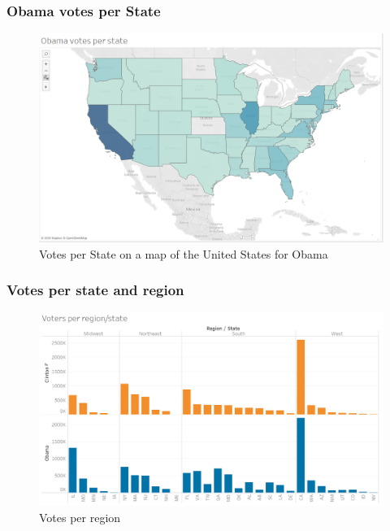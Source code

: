\documentclass[11pt]{article}
\begin{document}
\subsubsection{Obama votes per State}
\begin{figure}[H]
    \centering
    \includegraphics[width=0.90\columnwidth]{assets/obama_state.PNG}
    \caption{Votes per State on a map of the United States for Obama }
    \label{lr}
\end{figure}

\subsubsection{Votes per state and region}
\begin{figure}[H]
    \centering
    \includegraphics[width=0.90\columnwidth]{assets/vote_region.PNG}
    \caption{Votes per region }
    \label{lr}
\end{figure}
\end{document}
